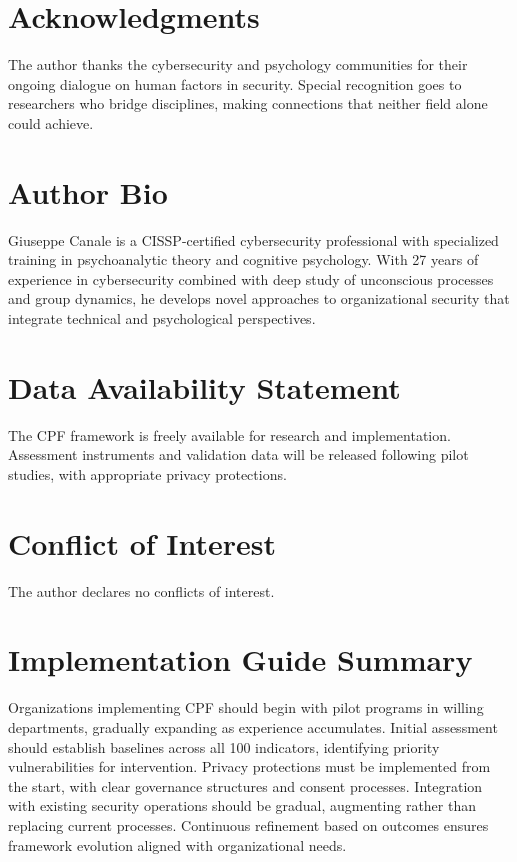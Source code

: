 \documentclass[manuscript,screen,review]{acmart}
\begin{document}
\section*{Acknowledgments}

The author thanks the cybersecurity and psychology communities for their ongoing dialogue on human factors in security. Special recognition goes to researchers who bridge disciplines, making connections that neither field alone could achieve.

\section*{Author Bio}

Giuseppe Canale is a CISSP-certified cybersecurity professional with specialized training in psychoanalytic theory and cognitive psychology. With 27 years of experience in cybersecurity combined with deep study of unconscious processes and group dynamics, he develops novel approaches to organizational security that integrate technical and psychological perspectives.

\section*{Data Availability Statement}

The CPF framework is freely available for research and implementation. Assessment instruments and validation data will be released following pilot studies, with appropriate privacy protections.

\section*{Conflict of Interest}

The author declares no conflicts of interest.

\appendix

\section{Implementation Guide Summary}
\label{app:implementation}

Organizations implementing CPF should begin with pilot programs in willing departments, gradually expanding as experience accumulates. Initial assessment should establish baselines across all 100 indicators, identifying priority vulnerabilities for intervention. Privacy protections must be implemented from the start, with clear governance structures and consent processes. Integration with existing security operations should be gradual, augmenting rather than replacing current processes. Continuous refinement based on outcomes ensures framework evolution aligned with organizational needs.
\end{document}
